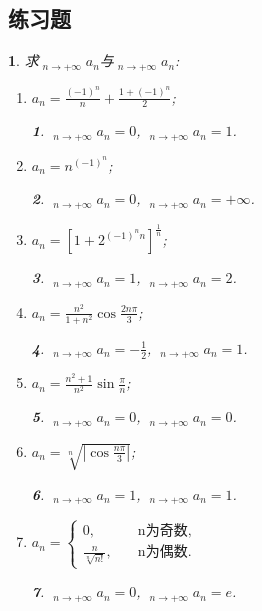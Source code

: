 \documentclass[utf8]{book}
\newtheorem{example}{}[section]             %
\newtheorem{solution}{}
\DeclareMathOperator*\lowlim{\underline{lim}}
\DeclareMathOperator*\uplim{\overline{lim}}
\begin{document}
\subsection{练习题}
\begin{example}求$\displaystyle\lowlim_{n\to +\infty}a_n$与$\displaystyle\uplim_{n\to +\infty}a_n$:
\renewcommand\labelenumi{\normalfont(\theenumi)}
\begin{enumerate}
\item $a_n = \displaystyle\frac{(-1)^n}{n}+\displaystyle\frac{1+(-1)^n}{2}$;
\begin{solution}
$\displaystyle\lowlim_{n\to +\infty}a_n = 0$, $\displaystyle\uplim_{n\to +\infty}a_n = 1$.
\end{solution}
\item $a_n = n^{(-1)^n}$;
\begin{solution}
$\displaystyle\lowlim_{n\to +\infty}a_n = 0$, $\displaystyle\uplim_{n\to +\infty}a_n = +\infty$.
\end{solution}
\item $a_n = [1+2^{(-1)^nn}]^{\frac{1}{n}}$;
\begin{solution}
$\displaystyle\lowlim_{n\to +\infty}a_n = 1$, $\displaystyle\uplim_{n\to +\infty}a_n = 2$.
\end{solution}
\item $a_n = \frac{n^2}{1+n^2}\cos{\frac{2n\pi}{3}}$;
\begin{solution}
$\displaystyle\lowlim_{n\to +\infty}a_n = -\frac{1}{2}$, $\displaystyle\uplim_{n\to +\infty}a_n = 1$.
\end{solution}
\item $a_n = \frac{n^2+1}{n^2}\sin\frac{\pi}{n}$;
\begin{solution}
$\displaystyle\lowlim_{n\to +\infty}a_n = 0$, $\displaystyle\uplim_{n\to +\infty}a_n = 0$.
\end{solution}
\item $a_n=\displaystyle\sqrt[n]{\left|\cos\frac{n\pi}{3}\right|}$;
\begin{solution}
$\displaystyle\lowlim_{n\to +\infty}a_n = 1$, $\displaystyle\uplim_{n\to +\infty}a_n = 1$.
\end{solution}
\item $a_n = 
\begin{cases}
0, \quad &\text{n为奇数},\\
\frac{n}{\sqrt[n]{n!}},\quad &\text{n为偶数}.
\end{cases}$
\begin{solution}
$\displaystyle\lowlim_{n\to +\infty}a_n = 0$, $\displaystyle\uplim_{n\to +\infty}a_n = e$.
\end{solution}
\end{enumerate}
\end{example}
\end{document}
